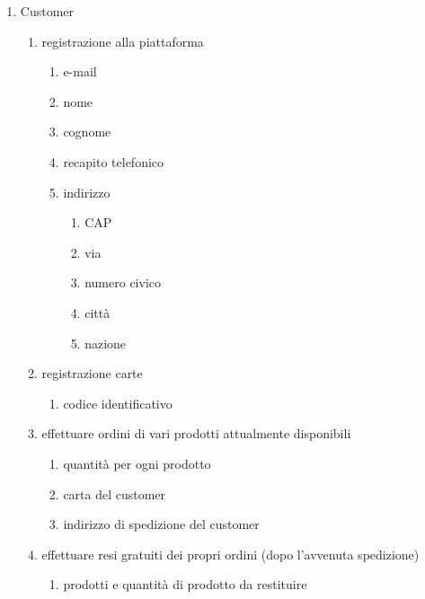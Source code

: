 \documentclass[12pt]{report}
\begin{document}
    \begin{enumerate}
        \item Customer
            \begin{enumerate}
                \item registrazione alla piattaforma
                    \begin{enumerate}
                        \item e-mail
                        \item nome
                        \item cognome
                        \item recapito telefonico
                        \item indirizzo
                            \begin{enumerate}
                                \item CAP
                                \item via
                                \item numero civico
                                \item città
                                \item nazione
                            \end{enumerate}
                    \end{enumerate}
                \item registrazione carte
                    \begin{enumerate}
                        \item codice identificativo
                    \end{enumerate}
                \item effettuare ordini di vari prodotti attualmente disponibili
                    \begin{enumerate}
                        \item quantità per ogni prodotto
                        \item carta del customer
                        \item indirizzo di spedizione del customer
                    \end{enumerate}
                \item effettuare resi gratuiti dei propri ordini (dopo l'avvenuta spedizione)
                    \begin{enumerate}
                        \item prodotti e quantità di prodotto da restituire

\end{enumerate}
\end{enumerate}
\end{enumerate}
\end{document}
